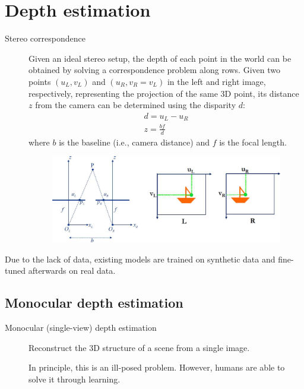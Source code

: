 \chapter{Depth estimation}


\begin{description}
    \item[Stereo correspondence] 
        Given an ideal stereo setup, the depth of each point in the world can be obtained by solving a correspondence problem along rows. Given two points $(u_L, v_L)$ and $(u_R, v_R=v_L)$ in the left and right image, respectively, representing the projection of the same 3D point, its distance $z$ from the camera can be determined using the disparity $d$:
        \[
            \begin{gathered}
                d = u_L - u_R \\
                z = \frac{bf}{d}
            \end{gathered}
        \]
        where $b$ is the baseline (i.e., camera distance) and $f$ is the focal length.

        \begin{figure}[H]
            \centering
            \includegraphics[width=0.65\linewidth]{./img/stereo_correspondence.jpg}
        \end{figure}
\end{description}

\begin{remark}
    Due to the lack of data, existing models are trained on synthetic data and fine-tuned afterwards on real data.
\end{remark}



\section{Monocular depth estimation}

\begin{description}
    \item[Monocular (single-view) depth estimation] 
        Reconstruct the 3D structure of a scene from a single image.

        \begin{remark}
            In principle, this is an ill-posed problem. However, humans are able to solve it through learning.
        \end{remark}
\end{description}


